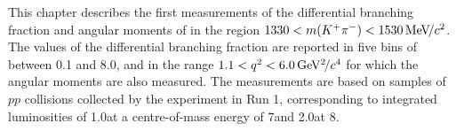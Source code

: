 This chapter describes the first measurements of the differential branching fraction and angular moments of \BdToKpimm in the region $1330<m({{K}^+}{{\pi}^-})<1530{\mathrm{\,Me\kern -0.1em V\!/}c^2}$. The values of the differential branching fraction are reported in five bins of \qsq between 0.1 and 8.0\gevgevcccc, and in the range $1.1<{q^2}<6.0{\mathrm{\,Ge\kern -0.1em V^2\!/}c^4}$ for which the angular moments are also measured. The measurements are based on samples of $pp$ collisions collected by the \lhcb experiment in Run 1, corresponding to integrated luminosities of 1.0\invfb at a centre-of-mass energy of 7\tev and 2.0\invfb at 8\tev.  